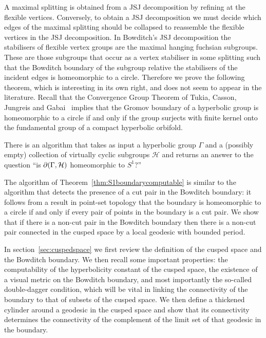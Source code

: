 A maximal splitting is obtained from a JSJ decomposition by refining at the
flexible vertices. Conversely, to obtain a JSJ decomposition we must decide
which edges of the maximal splitting should be collapsed to reassemble the
flexible vertices in the JSJ decomposition. In Bowditch's JSJ decomposition the
stabilisers of flexible vertex groups are the maximal hanging fuchsian
subgroups. These are those subgroups that occur as a vertex stabiliser in some
splitting such that the Bowditch boundary of the subgroup relative the
stabilisers of the incident edges is homeomorphic to a circle. Therefore we
prove the following theorem, which is interesting in its own right, and does
not seem to appear in the literature.  Recall that the Convergence Group
Theorem of Tukia, Casson, Jungreis and Gabai~\cite{tukia88, cassonjungreis94,
gabai92} implies that the Gromov boundary of a hyperbolic group is homeomorphic
to a circle if and only if the group surjects with finite kernel onto the
fundamental group of a compact hyperbolic orbifold.

\begin{thm}\label{thm:S1boundarycomputable} There is an algorithm that takes as
input a hyperbolic group $\Gamma$ and a (possibly empty) collection of
virtually cyclic subgroups $\mathcal{H}$ and returns an answer to the
question ``is $\partial(\Gamma, \mathcal{H})$ homeomorphic to
$S^1$?''\end{thm}

The algorithm of Theorem~\ref{thm:S1boundarycomputable} is similar to the
algorithm that detects the presence of a cut pair in the Bowditch boundary: it
follows from a result in point-set topology that the boundary is homeomorphic
to a circle if and only if every pair of points in the boundary is a cut pair.
We show that if there is a non-cut pair in the Bowditch boundary then there is
a non-cut pair connected in the cusped space by a local geodesic with bounded
period. 

In section~\ref{sec:cuspedspace} we first review the definition of the cusped
space and the Bowditch boundary. We then recall some important properties: the
computability of the hyperbolicity constant of the cusped space, the existence
of a visual metric on the Bowditch boundary, and most importantly the so-called
double-dagger condition, which will be vital in linking the connectivity of the
boundary to that of subsets of the cusped space. We then define a thickened
cylinder around a geodesic in the cusped space and show that its connectivity
determines the connectivity of the complement of the limit set of that geodesic
in the boundary.

